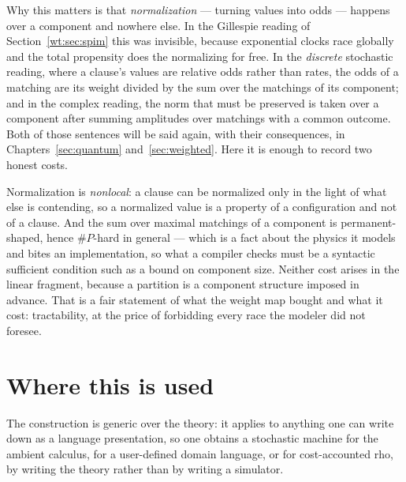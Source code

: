 Why this matters is that \emph{normalization} --- turning values into odds --- happens
over a component and nowhere else. In the Gillespie reading of Section~\ref{wt:sec:spim}
this was invisible, because exponential clocks race globally and the total propensity
does the normalizing for free. In the \emph{discrete} stochastic reading, where a
clause's values are relative odds rather than rates, the odds of a matching are its weight
divided by the sum over the matchings of its component; and in the complex reading, the
norm that must be preserved is taken over a component after summing amplitudes over
matchings with a common outcome. Both of those sentences will be said again, with their
consequences, in Chapters~\ref{sec:quantum} and~\ref{sec:weighted}. Here it is enough to
record two honest costs.

\begin{remark}
\label{gw:rmk:costs}
Normalization is \emph{nonlocal}: a clause can be normalized only in the light of what
else is contending, so a normalized value is a property of a configuration and not of a
clause. And the sum over maximal matchings of a component is permanent-shaped, hence
$\#P$-hard in general --- which is a fact about the physics it models and bites an
implementation, so what a compiler checks must be a syntactic sufficient condition such
as a bound on component size. Neither cost arises in the linear fragment, because a
partition is a component structure imposed in advance. That is a fair statement of what
the weight map bought and what it cost: tractability, at the price of forbidding every
race the modeler did not foresee.
\end{remark}

\section{Where this is used}

The construction is generic over the theory: it applies to anything one can write down as
a language presentation, so one obtains a stochastic machine for the ambient calculus, for
a user-defined domain language, or for cost-accounted rho, by writing the theory rather
than by writing a simulator.

